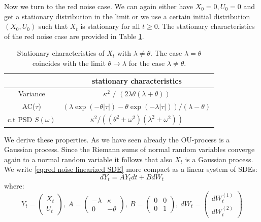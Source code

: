 \documentclass[%
thesis=student,%
coverpage=false,%
titlepage=false,%
headmarks=true, %
english,%
font=libertine, %
math=newpxtx, %
BCOR=5mm,%
coverBCOR=11mm%
]{tumbook}
\begin{document}
Now we turn to the red noise case. We can again either have $X_{0} = 0, U_{0} = 0$ and get a stationary distribution in the limit or we use a certain initial distribution $(X_{0},U_{0})$ such that $X_{t}$ is stationary for all $t \geq 0$. The stationary characteristics of the red noise case are provided in Table \ref{tab:red_noise_stat_char}.

\begin{table}[h!]
\centering
\begin{tabular}{|c|c|}
\hline
& stationary characteristics\\
\hline
Variance & $\kappa^2$ / $(2\lambda\theta(\lambda + \theta))$\\
AC($\tau$) & $(\lambda\exp(-\theta\lvert\tau\rvert)-\theta\exp(-\lambda\lvert\tau\rvert))/(\lambda - \theta)$\\
c.t PSD $S(\omega)$ & $\kappa^2/((\theta^2 + \omega^2)(\lambda^2 + \omega^2))$\\
\hline
\end{tabular}
\caption{Stationary characteristics of $X_{t}$ with $\lambda \neq \theta$. The case $\lambda = \theta$ coincides with the limit $\theta \rightarrow \lambda$ for the case $\lambda \neq \theta$.}
\label{tab:red_noise_stat_char}
\end{table}

We derive these properties. As we have seen already the OU-process is a Gaussian process. Since the Riemann sums of normal random variables converge again to a normal random variable it follows that also $X_{t}$ is a Gaussian process. We write \eqref{eq:red noise linearized SDE} more compact as a linear system of SDEs: 
\[
dY_{t} = AY_{t}dt + BdW_{t}
\]
where:
\begin{equation}
        Y_{t} = 
    \begin{pmatrix}
       X_{t} \\
       U_{t}
    \end{pmatrix}
    ,\ A = 
    \begin{pmatrix}
        -\lambda &  \kappa \\
        0        & -\theta
    \end{pmatrix}
    ,\ B = 
    \begin{pmatrix}
        0 & 0 \\
        0 & 1
    \end{pmatrix}
    ,\ dW_{t} = 
    \begin{pmatrix}
        dW_{t}^{(1)} \\
        dW_{t}^{(2)}
    \end{pmatrix}
    \label{summarized 2D SDE}
\end{equation}
\end{document}
